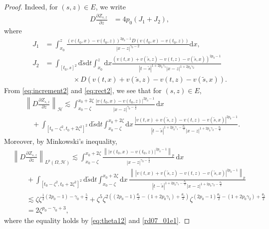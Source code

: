 \documentclass[10pt,a4paper]{amsart}
\newcommand {\deltah}{{\zeta}}
\newcommand {\half}{\frac 12}
\renewcommand{\d}{\mathrm{d}}
\begin{document}
\begin{proof}
 Indeed, for $(s,z)\in E$, we write
           \begin{align*}
           D\frac{\partial Z_{s,z}}{\partial z}&=
           4p_0(J_1+J_2),
           \end{align*}
           where 
\begin{align*}
     J_1&=\int_{x_0}^z \frac {(v(t_0,x)-v(t_0,z))^{2p_0-1}  D(v(t_0, x)-v(t_0,z))}{|x-z|^{\gamma_0-2} }\d x, \\[7pt]
           J_2&=\int_{[t_0, s]^2}\d \tilde{s}\d t \int_{x_0}^z \d x\frac {(v(t,x)+v(\tilde{s},z)-v(t,z)-v(\tilde{s},x))^{2p_0-1}
             }{|t-\tilde{s}|^{1+2p_0\gamma_1}|x-z|^{1+2p_0\gamma_2}} \\
              &\qquad\qquad \times D(v(t,x)+v(\tilde{s},z)-v(t,z)-v(\tilde{s},x)).
\end{align*}
From \eqref{eq:increment2} and \eqref{eq:rect2}, we see that for $(s,z)\in E$,
           \begin{align*}
           &\left\|D\frac{\partial Z_{s,z}}{\partial z}\right\|_{\mathcal{H}}\lesssim 
           \int_{x_0-\deltah}^{x_0+2\deltah} \frac {|v(t_0,x)-v(t_0,z)|^{2p_0-1}}{|x-z|^{\gamma_0-\frac52} }\, \d x\\
           &\quad + \int_{[t_0-\deltah^2, t_0+2\deltah^2]^2}\d \tilde{s}\d t \int_{x_0-\deltah}^{x_0+2\deltah} \d x \, 
            \frac {|v(t,x)+v(\tilde{s},z)-v(t,z)-v(\tilde{s},x)|^{2p_0-1}
             }{|t-\tilde{s}|^{1+2p_0\gamma_1-\frac{\theta_1}{2}}|x-z|^{1+2p_0\gamma_2-\frac{\theta_2}{2}}}.
           \end{align*}
           Moreover, by Minkowski's inequality, 
          \begin{align*}
           &\left\|D\frac{\partial Z_{s,z}}{\partial z}\right\|_{L^p(\Omega, \mathcal{H})}\lesssim 
           \int_{x_0-\deltah}^{x_0+2\deltah} \frac {\left\||v(t_0,x)-v(t_0,z)|^{2p_0-1}\right\|_{p}}{|x-z|^{\gamma_0-\frac52} }\, \d x\\
           &\qquad+ \int_{[t_0-\deltah^2, t_0+2\deltah^2]^2}\d \tilde{s}\d t \int_{x_0-\deltah}^{x_0+2\deltah} \d x \, 
            \frac {\left\|\, |v(t,x)+v(\tilde{s},z)-v(t,z)-v(\tilde{s},x)|^{2p_0-1}\right\|_{p}
             }{|t-\tilde{s}|^{1+2p_0\gamma_1-\frac{\theta_1}{2}}|x-z|^{1+2p_0\gamma_2-\frac{\theta_2}{2}}}\\
             &\qquad   \lesssim \deltah \deltah^{\half (2p_0 -1) -\gamma_0+\frac 5 2} + \deltah^{5}\deltah^{2((2p_0-1)\frac{\theta_1}{2} -(1+2p_0\gamma_1)+\frac{\theta_1}{2})}\deltah^{(2p_0-1)\frac{\theta_2}{2}-(1+2p_0\gamma_2)+\frac{\theta_2}{2}}\\
             &\qquad=2\deltah^{p_0-\gamma_0+3},
           \end{align*}
           where the equality holds by \eqref{eq:theta12} and \eqref{rd07_01e1}.
\medskip
   

\end{proof}
\end{document}
